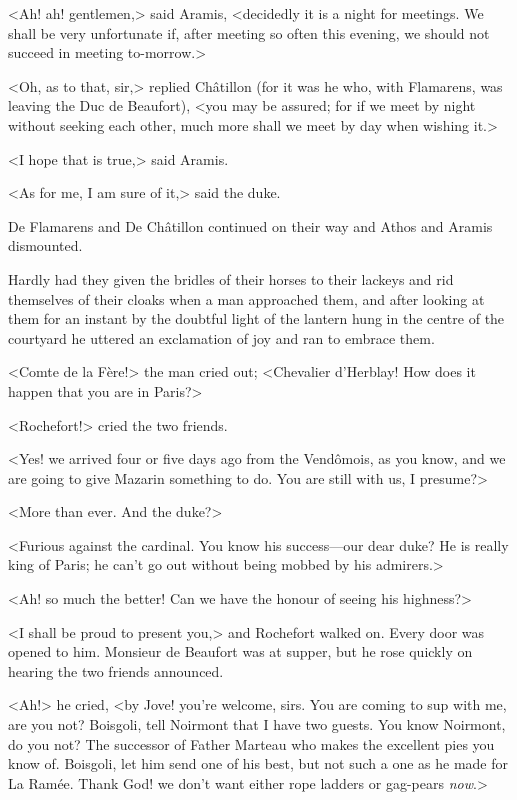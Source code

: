 <Ah! ah! gentlemen,> said Aramis, <decidedly it is a night for meetings. We shall be very unfortunate if, after meeting so often this evening, we should not succeed in meeting to-morrow.>

<Oh, as to that, sir,> replied Châtillon (for it was he who, with Flamarens, was leaving the Duc de Beaufort), <you may be assured; for if we meet by night without seeking each other, much more shall we meet by day when wishing it.>

<I hope that is true,> said Aramis.

<As for me, I am sure of it,> said the duke.

De Flamarens and De Châtillon continued on their way and Athos and Aramis dismounted.

Hardly had they given the bridles of their horses to their lackeys and rid themselves of their cloaks when a man approached them, and after looking at them for an instant by the doubtful light of the lantern hung in the centre of the courtyard he uttered an exclamation of joy and ran to embrace them.

<Comte de la Fère!> the man cried out; <Chevalier d'Herblay! How does it happen that you are in Paris?>

<Rochefort!> cried the two friends.

<Yes! we arrived four or five days ago from the Vendômois, as you know, and we are going to give Mazarin something to do. You are still with us, I presume?>

<More than ever. And the duke?>

<Furious against the cardinal. You know his success—our dear duke? He is really king of Paris; he can't go out without being mobbed by his admirers.>

<Ah! so much the better! Can we have the honour of seeing his highness?>

<I shall be proud to present you,> and Rochefort walked on. Every door was opened to him. Monsieur de Beaufort was at supper, but he rose quickly on hearing the two friends announced.

<Ah!> he cried, <by Jove! you're welcome, sirs. You are coming to sup with me, are you not? Boisgoli, tell Noirmont that I have two guests. You know Noirmont, do you not? The successor of Father Marteau who makes the excellent pies you know of. Boisgoli, let him send one of his best, but not such a one as he made for La Ramée. Thank God! we don't want either rope ladders or gag-pears \emph{now}.>

